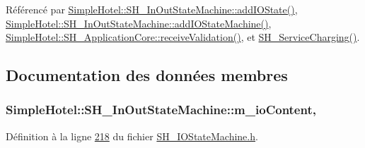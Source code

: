 Référencé par \hyperlink{classSimpleHotel_1_1SH__InOutStateMachine_a07ae9f1f74a9a41b26e77a014679a33e}{Simple\-Hotel\-::\-S\-H\-\_\-\-In\-Out\-State\-Machine\-::add\-I\-O\-State()}, \hyperlink{classSimpleHotel_1_1SH__InOutStateMachine_a27a59a44e0bcddf90d40b38788bb38f4}{Simple\-Hotel\-::\-S\-H\-\_\-\-In\-Out\-State\-Machine\-::add\-I\-O\-State\-Machine()}, \hyperlink{classSimpleHotel_1_1SH__ApplicationCore_ae597b1ac2cc9efb4fe0a61df806bd81a}{Simple\-Hotel\-::\-S\-H\-\_\-\-Application\-Core\-::receive\-Validation()}, et \hyperlink{classSimpleHotel_1_1SH__ServiceCharging_ae82c86c7e955f0dc93cdfc3603789b87}{S\-H\-\_\-\-Service\-Charging()}.



\subsection{Documentation des données membres}
\hypertarget{classSimpleHotel_1_1SH__InOutStateMachine_a4b0a3a48b0da31fddb724a357ad9b52c}{
\subsubsection[{m\-\_\-io\-Content}]{\setlength{\rightskip}{0pt plus 5cm}Simple\-Hotel\-::\-S\-H\-\_\-\-In\-Out\-State\-Machine\-::m\-\_\-io\-Content\hspace{0.3cm}{\ttfamily [protected]}, {\ttfamily [inherited]}}}\label{classSimpleHotel_1_1SH__InOutStateMachine_a4b0a3a48b0da31fddb724a357ad9b52c}


Définition à la ligne \hyperlink{SH__IOStateMachine_8h_source_l00218}{218} du fichier \hyperlink{SH__IOStateMachine_8h_source}{S\-H\-\_\-\-I\-O\-State\-Machine.\-h}.



